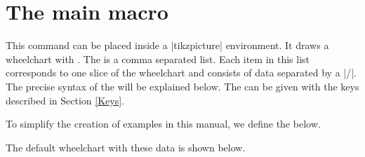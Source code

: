 \documentclass[a4paper,english,dvipsnames]{ltxdoc}
\begin{document}
\section{The main macro}
\begin{command}{\wheelchart{}}
This command can be placed inside a |tikzpicture| environment. It draws a wheelchart with . The  is a comma separated list. Each item in this list corresponds to one slice of the wheelchart and consists of data separated by a |/|. The precise syntax of the  will be explained below. The  can be given with the keys described in Section \ref{Keys}.
\begin{command}{\exampleforthismanual}
To simplify the creation of examples in this manual, we define the  below.
\begin{codeexample}[]
\gdef\exampleforthismanual{%
14/Apricot/Apricot/{A, B, C, E, K}/{north east lines}/0/0/Gray,
40/LimeGreen/Lime/{B, C}/grid/0/15/Black,
20/Melon/Melon/{A, C}//0.5/0/none,
16/OliveGreen/Olive/{A, B, E, K}/dots/0/0/none,
28/Peach/Peach/{A, B, C, E, K}/{fivepointed stars}/0/0/Lavender,
32/Plum/Plum/{A, B, C, E, K}/bricks/0/{-15}/none,
50/WildStrawberry/Strawberry/{B, C, E, K}//1/0/DarkOrchid%
}
\end{codeexample}%
\end{command}
The default wheelchart with these data is shown below.
\begin{codeexample}[width=10cm]
\begin{tikzpicture}
\wheelchart{\exampleforthismanual}
\end{tikzpicture}
\end{codeexample}
\end{command}
\end{document}
